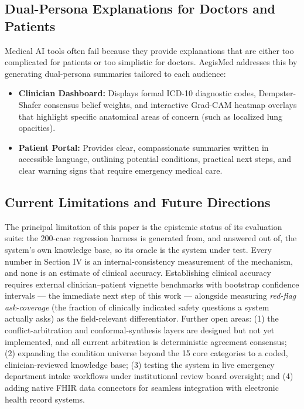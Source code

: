 \documentclass[10pt,twocolumn]{article}
\begin{document}
\subsection{Dual-Persona Explanations for Doctors and Patients}
Medical AI tools often fail because they provide explanations that are either too complicated for patients or too simplistic for doctors. AegisMed addresses this by generating dual-persona summaries tailored to each audience:
\begin{itemize}
    \item \textbf{Clinician Dashboard:} Displays formal ICD-10 diagnostic codes, Dempster-Shafer consensus belief weights, and interactive Grad-CAM heatmap overlays that highlight specific anatomical areas of concern (such as localized lung opacities).
    \item \textbf{Patient Portal:} Provides clear, compassionate summaries written in accessible language, outlining potential conditions, practical next steps, and clear warning signs that require emergency medical care.
\end{itemize}

\subsection{Current Limitations and Future Directions}
The principal limitation of this paper is the epistemic status of its evaluation suite: the 200-case regression harness is generated from, and answered out of, the system's own knowledge base, so its oracle is the system under test. Every number in Section IV is an internal-consistency measurement of the mechanism, and none is an estimate of clinical accuracy. Establishing clinical accuracy requires external clinician--patient vignette benchmarks with bootstrap confidence intervals --- the immediate next step of this work --- alongside measuring \emph{red-flag ask-coverage} (the fraction of clinically indicated safety questions a system actually asks) as the field-relevant differentiator. Further open areas: (1) the conflict-arbitration and conformal-synthesis layers are designed but not yet implemented, and all current arbitration is deterministic agreement consensus; (2) expanding the condition universe beyond the 15 core categories to a coded, clinician-reviewed knowledge base; (3) testing the system in live emergency department intake workflows under institutional review board oversight; and (4) adding native FHIR data connectors for seamless integration with electronic health record systems.
\end{document}

